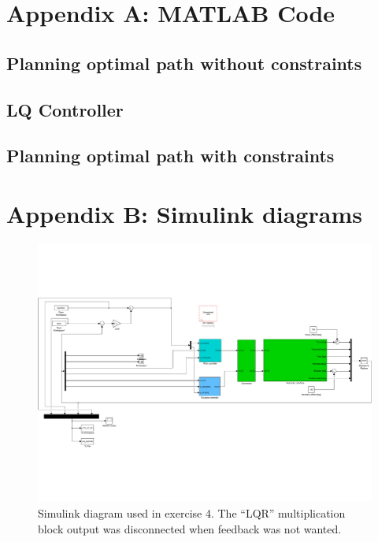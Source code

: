 
\begin{appendices}
\section{Appendix A: MATLAB Code}
\label{appendix:A}

\subsection{Planning optimal path without constraints}


\subsection{LQ Controller}


\subsection{Planning optimal path with constraints}




\section{Appendix B: Simulink diagrams}
\label{appendix:B}

\begin{figure}
    \includegraphics[width=\textwidth]{ex4sim.pdf}
    \caption{Simulink diagram used in exercise 4. The ``LQR'' multiplication block output was disconnected when feedback was not wanted.}
\end{figure}
\end{appendices}

